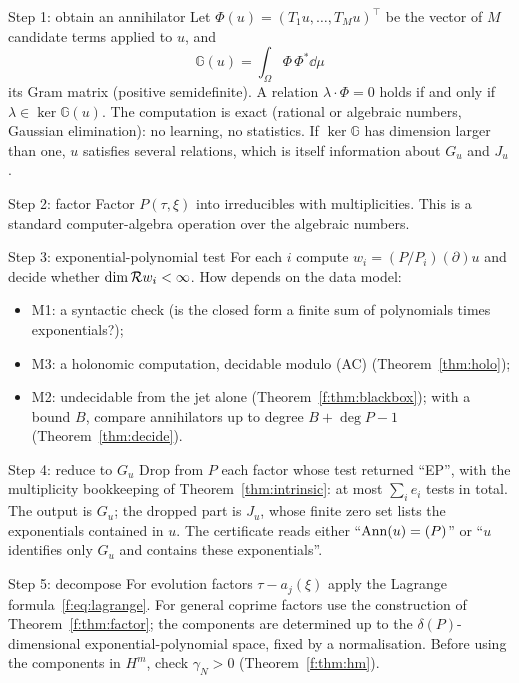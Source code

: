 \begin{aside}{Step 1: obtain an annihilator}
Let $\Phi(u)=(T_1u,\dots,T_Mu)^{\top}$ be the vector of $M$ candidate terms applied to $u$, and
\[
\mathbb G(u)=\int_\Omega\Phi\,\Phi^{*}\dd\mu
\]
its Gram matrix (positive semidefinite). A relation $\lambda\cdot\Phi=0$ holds if and only if $\lambda\in\ker\mathbb G(u)$. The computation is exact (rational or algebraic numbers, Gaussian elimination): no learning, no statistics. If $\ker\mathbb G$ has dimension larger than one, $u$ satisfies several relations, which is itself information about $G_u$ and $J_u$.
\end{aside}

\begin{aside}{Step 2: factor}
Factor $P(\tau,\xi)$ into irreducibles with multiplicities. This is a standard computer-algebra operation over the algebraic numbers.
\end{aside}

\begin{aside}{Step 3: exponential-polynomial test}
For each $i$ compute $w_i=(P/P_i)(\partial)u$ and decide whether $\operatorname{dim}\mathcal{R} w_i<\infty$. How depends on the data model:
\begin{itemize}
\item M1: a syntactic check (is the closed form a finite sum of polynomials times exponentials?);
\item M3: a holonomic computation, decidable modulo (AC) (Theorem~\ref{thm:holo});
\item M2: undecidable from the jet alone (Theorem~\ref{f:thm:blackbox}); with a bound $B$, compare annihilators up to degree $B+\deg P-1$ (Theorem~\ref{thm:decide}).
\end{itemize}
\end{aside}

\begin{aside}{Step 4: reduce to $G_u$}
Drop from $P$ each factor whose test returned ``EP'', with the multiplicity bookkeeping of Theorem~\ref{thm:intrinsic}: at most $\sum_ie_i$ tests in total. The output is $G_u$; the dropped part is $J_u$, whose finite zero set lists the exponentials contained in $u$. The certificate reads either ``$\operatorname{Ann}(u)=(P)$'' or ``$u$ identifies only $G_u$ and contains these exponentials''.
\end{aside}

\begin{aside}{Step 5: decompose}
For evolution factors $\tau-a_j(\xi)$ apply the Lagrange formula~\eqref{f:eq:lagrange}. For general coprime factors use the construction of Theorem~\ref{f:thm:factor}; the components are determined up to the $\delta(P)$-dimensional exponential-polynomial space, fixed by a normalisation. Before using the components in $H^m$, check $\gamma_N>0$ (Theorem~\ref{f:thm:hm}).
\end{aside}

